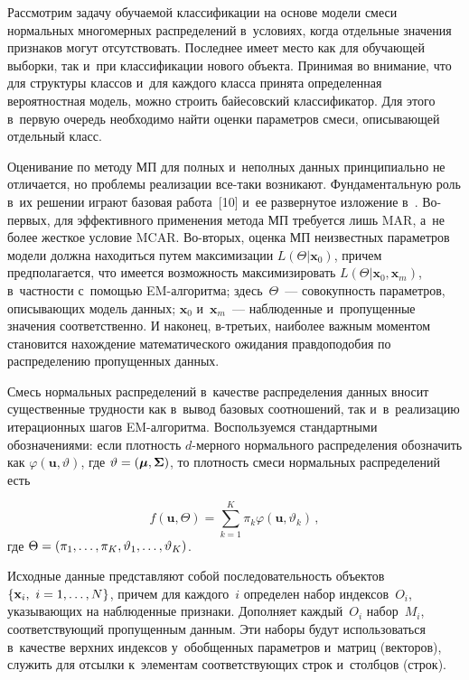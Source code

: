 \begin{multicols}{2}
\vspace*{-2pt}

     Рассмотрим задачу обучаемой классификации на основе модели смеси 
нормальных многомерных распределений в~условиях, когда отдельные 
значения признаков могут отсутствовать. Последнее имеет место как для 
обучающей выборки, так и~при классификации нового объекта. Принимая во 
внимание, что для структуры классов и~для каж\-до\-го класса принята 
определенная вероятностная модель, можно строить байесовский 
классификатор. Для этого в~первую очередь необходимо найти оценки 
параметров смеси, описывающей отдельный класс.
     
     Оценивание по методу МП для полных 
и~неполных данных принципиально не отличается, но проблемы реализации 
все-та\-ки возникают. Фундаментальную роль в~их решении играют базовая 
работа~[10] и~ее развернутое изложение в~\cite{3-kri}. 
 Во-пер\-вых, для эффективного применения метода МП требуется лишь MAR, 
а~не более жесткое условие MCAR. Во-вто\-рых, оценка МП неизвестных 
параметров модели должна находиться путем максимизации 
     $L(\Theta\vert \mathbf{x}_0)$, причем предполагается, что имеется 
возможность максимизировать 
     $L(\Theta\vert \mathbf{x}_0, \mathbf{x}_m)$, в~частности с~помощью 
EM-ал\-го\-рит\-ма; здесь~$\Theta$~---  совокупность параметров, 
опи\-сы\-ва\-ющих модель данных; $\mathbf{x}_0$ и~$\mathbf{x}_m$~--- 
наблюденные и~пропущенные значения соответственно. И наконец, в-треть\-их, 
наиболее важным моментом становится нахождение математического 
ожидания правдоподобия по распределению пропущенных данных.
     
     Смесь нормальных распределений в~качестве распределения данных 
вносит существенные трудности как в~вывод базовых соотношений, так 
и~в~реализацию итерационных шагов EM-ал\-го\-рит\-ма. Воспользуемся 
стандартными обозначениями: если плотность $d$-мер\-но\-го нормального 
распределения обозначить как 
     $\varphi(\mathbf{u},\vartheta)$, где 
$\vartheta\hm=(\boldsymbol{\mu},\boldsymbol{\Sigma})$, то плотность смеси 
нормальных распределений есть 

\noindent
     $$
     f(\mathbf{u},\Theta)= \sum\limits^K_{k=1} 
\pi_k \varphi (\mathbf{u},\vartheta_k)\,,$$ 
где $\Theta\hm= (\pi_1,\ldots,\pi_K, 
\vartheta_1,\ldots ,\vartheta_K)$.
     
     Исходные данные представляют собой последовательность объектов 
     $\{\mathbf{x}_i,\ i\hm=1,\ldots, N\}$, причем для каждого~$i$ определен 
набор индексов~$O_i$, указывающих на наблюденные признаки. Дополняет 
каждый~$O_i$ набор~$M_i$, соответствующий пропущенным данным. Эти 
наборы будут использоваться в~качестве верхних индексов у~обобщенных 
параметров и~матриц (векторов), служить для отсылки к~элементам 
соответствующих строк и~столбцов (строк). 
     

\end{multicols}

